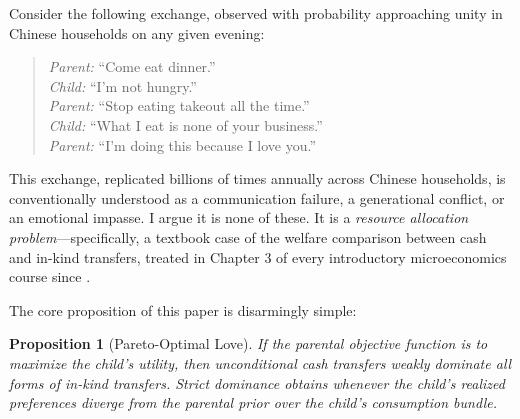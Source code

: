 \documentclass[AER]{AEA}
\newtheorem{proposition}{Proposition}
\begin{document}
\def\thefootnote{\arabic{footnote}}
\setcounter{footnote}{0}



Consider the following exchange, observed with probability approaching unity in Chinese households on any given evening:

\begin{quote}
\textit{Parent:} ``Come eat dinner.'' \\
\textit{Child:} ``I'm not hungry.'' \\
\textit{Parent:} ``Stop eating takeout all the time.'' \\
\textit{Child:} ``What I eat is none of your business.'' \\
\textit{Parent:} ``I'm doing this because I love you.''
\end{quote}

This exchange, replicated billions of times annually across Chinese households, is conventionally understood as a communication failure, a generational conflict, or an emotional impasse. I argue it is none of these. It is a \textit{resource allocation problem}---specifically, a textbook case of the welfare comparison between cash and in-kind transfers, treated in Chapter 3 of every introductory microeconomics course since \citet{pindyck2018}.

The core proposition of this paper is disarmingly simple:

\begin{proposition}[Pareto-Optimal Love]\label{prop:main}
If the parental objective function is to maximize the child's utility, then unconditional cash transfers weakly dominate all forms of in-kind transfers. Strict dominance obtains whenever the child's realized preferences diverge from the parental prior over the child's consumption bundle.
\end{proposition}
\end{document}

